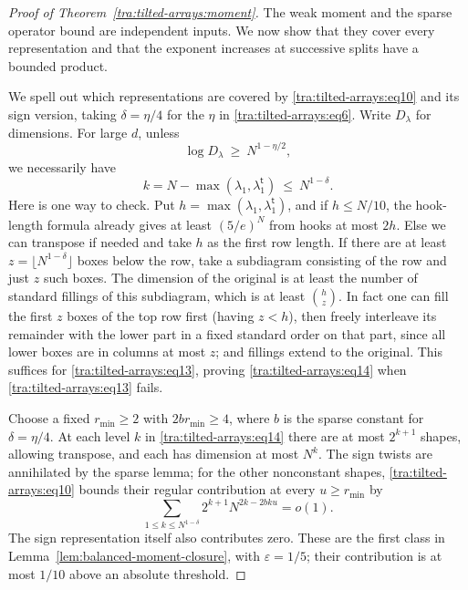 \begin{proof}[Proof of Theorem~\ref{tra:tilted-arrays:moment}]
\label{tra:tilted-arrays:moment-induction}
The weak moment and the sparse operator bound are independent inputs. We now show that they cover every representation and that the exponent increases at successive splits have a bounded product.

We spell out which representations are covered by \eqref{tra:tilted-arrays:eq10} and its sign version, taking
\(\delta=\eta/4\) for the \(\eta\) in \eqref{tra:tilted-arrays:eq6}. Write \(D_\lambda\) for dimensions. For large \(d\), unless
\begin{equation}
 \log D_\lambda\ \ge\ N^{1-\eta/2}, \label{tra:tilted-arrays:eq13}
\end{equation}
we necessarily have
\begin{equation}
 k=N-\max(\lambda_1,\lambda^{\mathsf t}_1)\ \le\ N^{1-\delta}. \label{tra:tilted-arrays:eq14}
\end{equation}
Here is one way to check. Put \(h=\max(\lambda_1,\lambda^{\mathsf t}_1)\), and if \(h\le N/10\), the hook-length formula already gives at least \((5/e)^N\) from hooks at most \(2h\). Else we can transpose if needed and take \(h\) as the first row length. If there are at least \(z=\lfloor N^{1-\delta}\rfloor\) boxes below the row, take a subdiagram consisting of the row and just \(z\) such boxes. The dimension of the original is at least the number of standard fillings of this subdiagram, which is at least \(\binom{h}{z}\). In fact one can fill the first \(z\) boxes of the top row first (having \(z<h\)), then freely interleave its remainder with the lower part in a fixed standard order on that part, since all lower boxes are in columns at most \(z\); and fillings extend to the original. This suffices for \eqref{tra:tilted-arrays:eq13}, proving \eqref{tra:tilted-arrays:eq14} when \eqref{tra:tilted-arrays:eq13} fails.

Choose a fixed $r_{\min}\ge2$ with $2br_{\min}\ge4$, where $b$
is the sparse constant for $\delta=\eta/4$. At each level $k$ in
\eqref{tra:tilted-arrays:eq14} there are at most $2^{k+1}$ shapes,
allowing transpose, and each has dimension at most $N^k$.
The sign twists are annihilated by the sparse lemma; for the other
nonconstant shapes, \eqref{tra:tilted-arrays:eq10} bounds their regular
contribution at every $u\ge r_{\min}$ by
\[
 \sum_{1\le k\le N^{1-\delta}}
       2^{k+1}N^{2k-2bku}=o(1).
\]
The sign representation itself also contributes zero. These are the
first class in Lemma~\ref{lem:balanced-moment-closure}, with
$\varepsilon=1/5$; their contribution is at most $1/10$ above an
absolute threshold.


\end{proof}
